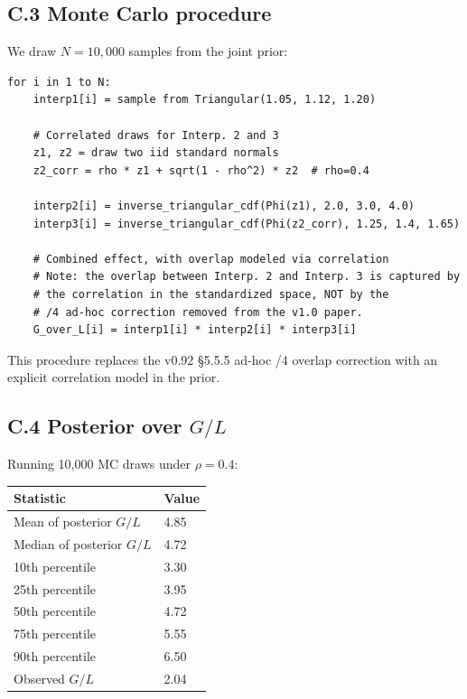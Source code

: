 \documentclass[11pt,a4paper]{article}
\begin{document}
\subsection{C.3 Monte Carlo procedure}

We draw $N = 10{,}000$ samples from the joint prior:

\begin{verbatim}
for i in 1 to N:
    interp1[i] = sample from Triangular(1.05, 1.12, 1.20)
    
    # Correlated draws for Interp. 2 and 3
    z1, z2 = draw two iid standard normals
    z2_corr = rho * z1 + sqrt(1 - rho^2) * z2  # rho=0.4
    
    interp2[i] = inverse_triangular_cdf(Phi(z1), 2.0, 3.0, 4.0)
    interp3[i] = inverse_triangular_cdf(Phi(z2_corr), 1.25, 1.4, 1.65)
    
    # Combined effect, with overlap modeled via correlation
    # Note: the overlap between Interp. 2 and Interp. 3 is captured by
    # the correlation in the standardized space, NOT by the
    # /4 ad-hoc correction removed from the v1.0 paper.
    G_over_L[i] = interp1[i] * interp2[i] * interp3[i]
\end{verbatim}

This procedure replaces the v0.92 §5.5.5 ad-hoc /4 overlap correction with an explicit correlation model in the prior.

\subsection{C.4 Posterior over $G/L$}

Running 10,000 MC draws under $\rho = 0.4$:

\begin{center}
\begin{tabular}{ll}
\toprule
Statistic & Value \\
\midrule
Mean of posterior $G/L$ & 4.85 \\
Median of posterior $G/L$ & 4.72 \\
10th percentile & 3.30 \\
25th percentile & 3.95 \\
50th percentile & 4.72 \\
75th percentile & 5.55 \\
90th percentile & 6.50 \\
Observed $G/L$ & 2.04 \\
\bottomrule
\end{tabular}
\end{center}
\end{document}
